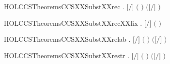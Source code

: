 \newcommand{\HOLCCSTheoremsCCSXXSubstXXprefix}{\UseVerbatim{HOLCCSTheoremsCCSXXSubstXXprefix}}
\begin{SaveVerbatim}{HOLCCSTheoremsCCSXXSubstXXrec}
\HOLTokenTurnstile{} \HOLSymConst{\HOLTokenForall{}}   .
       \ensuremath{[}\ensuremath{/}\ensuremath{]} \ensuremath{(}  \ensuremath{)} \HOLSymConst{\ensuremath{=}}
         \HOLSymConst{\ensuremath{=}}         \ensuremath{(}\ensuremath{[}\ensuremath{/}\ensuremath{]} \ensuremath{)}
\end{SaveVerbatim}
\newcommand{\HOLCCSTheoremsCCSXXSubstXXrec}{\UseVerbatim{HOLCCSTheoremsCCSXXSubstXXrec}}
\begin{SaveVerbatim}{HOLCCSTheoremsCCSXXSubstXXrecXXfix}
\HOLTokenTurnstile{} \HOLSymConst{\HOLTokenForall{}}  . \ensuremath{[}\ensuremath{/}\ensuremath{]} \ensuremath{(}  \ensuremath{)} \HOLSymConst{\ensuremath{=}}   
\end{SaveVerbatim}
\newcommand{\HOLCCSTheoremsCCSXXSubstXXrecXXfix}{\UseVerbatim{HOLCCSTheoremsCCSXXSubstXXrecXXfix}}
\begin{SaveVerbatim}{HOLCCSTheoremsCCSXXSubstXXrelab}
\HOLTokenTurnstile{} \HOLSymConst{\HOLTokenForall{}}   . \ensuremath{[}\ensuremath{/}\ensuremath{]} \ensuremath{(}  \ensuremath{)} \HOLSymConst{\ensuremath{=}}  \ensuremath{(}\ensuremath{[}\ensuremath{/}\ensuremath{]} \ensuremath{)} 
\end{SaveVerbatim}
\newcommand{\HOLCCSTheoremsCCSXXSubstXXrelab}{\UseVerbatim{HOLCCSTheoremsCCSXXSubstXXrelab}}
\begin{SaveVerbatim}{HOLCCSTheoremsCCSXXSubstXXrestr}
\HOLTokenTurnstile{} \HOLSymConst{\HOLTokenForall{}}   . \ensuremath{[}\ensuremath{/}\ensuremath{]} \ensuremath{(}  \ensuremath{)} \HOLSymConst{\ensuremath{=}}   \ensuremath{(}\ensuremath{[}\ensuremath{/}\ensuremath{]} \ensuremath{)}
\end{SaveVerbatim}
